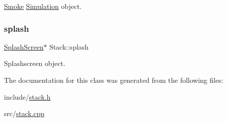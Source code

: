 \mbox{\hyperlink{classSmoke}{Smoke}} \mbox{\hyperlink{classSimulation}{Simulation}} object. 

\mbox{\label{classStack_a2d3f7bf6df4a15c81ed677fd728dda4c}} 
\subsubsection{\texorpdfstring{splash}{splash}}
{\footnotesize\ttfamily \mbox{\hyperlink{classSplashScreen}{Splash\+Screen}}$\ast$ Stack\+::splash\hspace{0.3cm}{\ttfamily [private]}}



Splashscreen object. 



The documentation for this class was generated from the following files\+:\begin{DoxyCompactItemize}
\item 
include/\mbox{\hyperlink{stack_8h}{stack.\+h}}\item 
src/\mbox{\hyperlink{stack_8cpp}{stack.\+cpp}}\end{DoxyCompactItemize}
